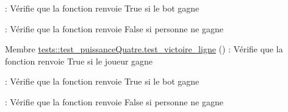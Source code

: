 \begin{DoxyRefList}
\+: Vérifie que la fonction renvoie True si le bot gagne 

\+: Vérifie que la fonction renvoie False si personne ne gagne 
\item[Membre \mbox{\hyperlink{namespacetests_1_1test__puissanceQuatre_a5a14786a10a6aa04c1b52ceda1c3db85}{tests\+::test\+\_\+puissance\+Quatre.test\+\_\+victoire\+\_\+ligne}} ()]\label{test__test000004}%
%
\+: Vérifie que la fonction renvoie True si le joueur gagne 

\+: Vérifie que la fonction renvoie True si le bot gagne 

\+: Vérifie que la fonction renvoie False si personne ne gagne
\end{DoxyRefList}